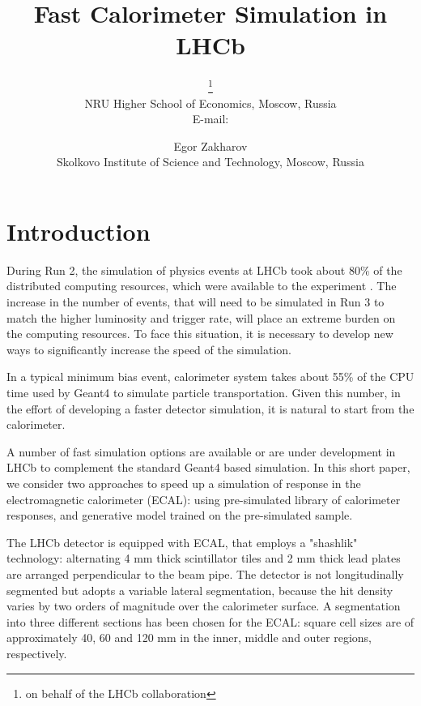 \documentclass{PoS}
\title{Fast Calorimeter Simulation in LHCb}
\author{\speaker{Fedor Ratnikov}\thanks{on
    behalf of the LHCb collaboration}\\
        NRU Higher School of Economics, Moscow, Russia\\
        E-mail: \email{Fedor.Ratnikov@cern.ch}}
\author{Egor Zakharov\\
        Skolkovo Institute of Science and Technology, Moscow, Russia
}
\begin{document}
\section{Introduction}
During Run 2, the simulation of physics events at LHCb took about
80\% of the distributed computing resources, which were available to the
experiment \cite{LHCbCompUpgTDR}. The increase in the number of events, that will need to be simulated
in Run 3 to match the higher luminosity and trigger rate, will place an
extreme burden on the computing resources. To face this situation,
it is necessary to develop new ways to significantly increase the speed
of the simulation.

In a typical minimum bias event, calorimeter system takes about 55\% of the CPU time used by Geant4 \cite{geant4} to simulate particle transportation. 
Given this number, in the effort of developing a faster detector simulation, it is natural to start from the calorimeter.

A number of fast simulation options are available or are under development
in LHCb to complement the standard Geant4 based simulation. 
In this short paper, we consider two approaches to speed up a simulation of response in the electromagnetic calorimeter (ECAL): using pre-simulated
library of calorimeter responses, and generative model trained on
the pre-simulated sample.

The LHCb detector \cite{LHCb} is equipped with  ECAL, that employs a "shashlik" technology: alternating 4 mm thick
scintillator tiles and 2 mm thick lead plates are arranged perpendicular
to the beam pipe. The detector is not longitudinally segmented but
adopts a variable lateral segmentation,  because the hit density varies
by two orders of magnitude over the calorimeter surface. 
A segmentation into three different sections has been chosen for the ECAL: square cell sizes are of approximately 40, 60 and 120 mm in the inner, middle and outer regions, respectively.

\end{document}
